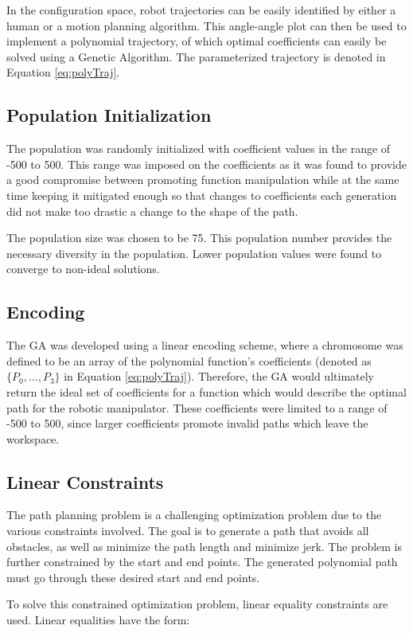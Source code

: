 In the configuration space, robot trajectories can be easily identified by either a human or a motion planning algorithm. This angle-angle plot can then be used to implement a polynomial trajectory, of which optimal coefficients can easily be solved using a Genetic Algorithm. The parameterized trajectory is denoted in Equation \ref{eq:polyTraj}.

\subsection{Population Initialization}

The population was randomly initialized with coefficient values in the range of -500 to 500. This range was imposed on the coefficients as it was found to provide a good compromise between promoting function manipulation while at the same time keeping it mitigated enough so that changes to coefficients each generation did not make too drastic a change to the shape of the path.

The population size was chosen to be 75. This population number provides the necessary diversity in the population. Lower population values were found to converge to non-ideal solutions.

\subsection{Encoding}
The GA was developed using a linear encoding scheme, where a chromosome was defined to be an array of the polynomial function's coefficients (denoted as $\{P_0, \ldots, P_3\}$ in Equation \ref{eq:polyTraj}). Therefore, the GA would ultimately return the ideal set of coefficients for a function which would describe the optimal path for the robotic manipulator. These coefficients were limited to a range of -500 to 500, since larger coefficients promote invalid paths which leave the workspace.

\subsection{Linear Constraints}
The path planning problem is a challenging optimization problem due to the various constraints involved. The goal is to generate a path that avoids all obstacles, as well as minimize the path length and minimize jerk. The problem is further constrained by the start and end points. The generated polynomial path must go through these desired start and end points.

To solve this constrained optimization problem, linear equality constraints are used. Linear equalities have the form:

